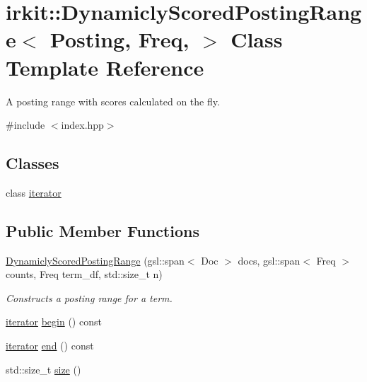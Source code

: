 \hypertarget{classirkit_1_1DynamiclyScoredPostingRange}{}\section{irkit\+:\+:Dynamicly\+Scored\+Posting\+Range$<$ Posting, Freq, $>$ Class Template Reference}
\label{classirkit_1_1DynamiclyScoredPostingRange}


A posting range with scores calculated on the fly.  




{\ttfamily \#include $<$index.\+hpp$>$}

\subsection*{Classes}
\begin{DoxyCompactItemize}
\item 
class \hyperlink{classirkit_1_1DynamiclyScoredPostingRange_1_1iterator}{iterator}
\end{DoxyCompactItemize}
\subsection*{Public Member Functions}
\begin{DoxyCompactItemize}
\item 
\hyperlink{classirkit_1_1DynamiclyScoredPostingRange_ad92fb9fb1d2923ca2f51ce938db18cfb}{Dynamicly\+Scored\+Posting\+Range} (gsl\+::span$<$ Doc $>$ docs, gsl\+::span$<$ Freq $>$ counts, Freq term\+\_\+df, std\+::size\+\_\+t n)
\begin{DoxyCompactList}\small\item\em Constructs a posting range for a term. \end{DoxyCompactList}\item 
\hyperlink{classirkit_1_1DynamiclyScoredPostingRange_1_1iterator}{iterator} \hyperlink{classirkit_1_1DynamiclyScoredPostingRange_a291cd11bd9c0216c64b252a79e4ff9a8}{begin} () const
\item 
\hyperlink{classirkit_1_1DynamiclyScoredPostingRange_1_1iterator}{iterator} \hyperlink{classirkit_1_1DynamiclyScoredPostingRange_a883c0faff34de6a5b1b95496a4729028}{end} () const
\item 
std\+::size\+\_\+t \hyperlink{classirkit_1_1DynamiclyScoredPostingRange_aabc7d6435dc95dedef86ee75530d189d}{size} ()
\end{DoxyCompactItemize}


